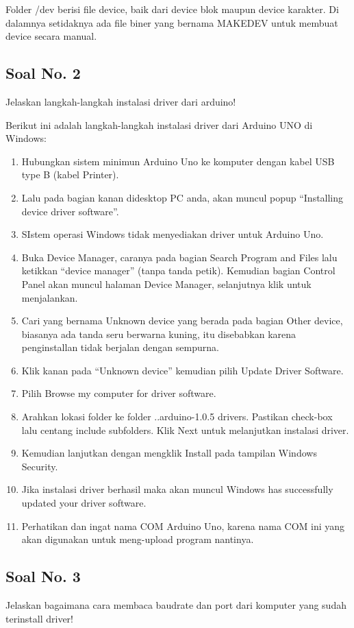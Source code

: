 \hfill \break
Folder /dev berisi file device, baik dari device blok maupun device karakter. Di dalamnya setidaknya ada file biner yang bernama MAKEDEV untuk membuat device secara manual.

\subsection{Soal No. 2}
Jelaskan langkah-langkah instalasi driver dari arduino!

\hfill \break
Berikut ini adalah langkah-langkah instalasi driver dari Arduino UNO di Windows:

\begin{enumerate}
    \item Hubungkan sistem minimun Arduino Uno ke komputer dengan kabel USB type B (kabel Printer).
    \item Lalu pada bagian kanan didesktop PC anda, akan muncul popup “Installing device driver software”.
    \item SIstem operasi Windows tidak menyediakan driver untuk Arduino Uno.
    \item Buka Device Manager, caranya pada bagian Search Program and Files lalu ketikkan “device manager” (tanpa tanda petik). Kemudian bagian Control Panel akan muncul halaman Device Manager, selanjutnya klik untuk menjalankan.
    \item Cari yang bernama Unknown device yang berada pada bagian Other device, biasanya ada tanda seru berwarna kuning, itu disebabkan karena penginstallan tidak berjalan dengan sempurna.
    \item Klik kanan pada “Unknown device” kemudian pilih Update Driver Software.
    \item Pilih Browse my computer for driver software.
    \item Arahkan lokasi folder ke folder ..arduino-1.0.5 drivers. Pastikan check-box lalu centang include subfolders. Klik Next untuk melanjutkan instalasi driver.
    \item Kemudian lanjutkan dengan mengklik Install pada tampilan Windows Security.
    \item Jika instalasi driver berhasil maka akan muncul Windows has successfully updated your driver software.
    \item Perhatikan dan ingat nama COM Arduino Uno, karena nama COM ini yang akan digunakan untuk meng-upload program nantinya.
\end{enumerate}

\subsection{Soal No. 3}
Jelaskan bagaimana cara membaca baudrate dan port dari komputer yang sudah terinstall driver!

